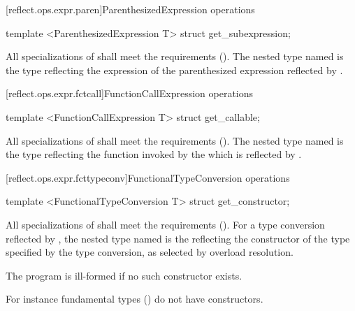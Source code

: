 [reflect.ops.expr.paren]{ParenthesizedExpression operations}
\begin{std.txt}\color{addclr}
\begin{itemdecl}
template <ParenthesizedExpression T> struct get_subexpression;
\end{itemdecl}
\begin{itemdescr}
\pnum
      All specializations of  shall meet the  requirements (). The nested type named  is the  type reflecting the expression  of the parenthesized expression  reflected by . 
\end{itemdescr}
\end{std.txt}

[reflect.ops.expr.fctcall]{FunctionCallExpression operations}
\begin{std.txt}\color{addclr}
\begin{itemdecl}
template <FunctionCallExpression T> struct get_callable;
\end{itemdecl}
\begin{itemdescr}
\pnum
      All specializations of  shall meet the  requirements (). The nested type named  is the  type reflecting the function invoked by the  which is reflected by .
\end{itemdescr}
\end{std.txt}


[reflect.ops.expr.fcttypeconv]{FunctionalTypeConversion operations}
\begin{std.txt}\color{addclr}
\begin{itemdecl}
template <FunctionalTypeConversion T> struct get_constructor;
\end{itemdecl}
\begin{itemdescr}
\pnum
			All specializations of  shall meet the  requirements (). For a type conversion reflected by , the nested type named  is the  reflecting the constructor of the type specified by the type conversion, as selected by overload resolution.

\pnum
\remarks
      The program is ill-formed if no such constructor exists.
      \begin{note} For instance fundamental types () do not have constructors. \end{note}
\end{itemdescr}
\end{std.txt}

